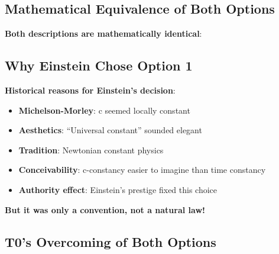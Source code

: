 	\subsection{Mathematical Equivalence of Both Options}
	
	\textbf{Both descriptions are mathematically identical}:
	
	\begin{table}[htbp]
		\centering
		\caption{Two views, identical physics}
	\end{table}
	
	\subsection{Why Einstein Chose Option 1}
	
	\textbf{Historical reasons for Einstein's decision}:
	\begin{itemize}
		\item \textbf{Michelson-Morley}: c seemed locally constant
		\item \textbf{Aesthetics}: ``Universal constant'' sounded elegant
		\item \textbf{Tradition}: Newtonian constant physics
		\item \textbf{Conceivability}: c-constancy easier to imagine than time constancy
		\item \textbf{Authority effect}: Einstein's prestige fixed this choice
	\end{itemize}
	
	\textbf{But it was only a convention, not a natural law!}
	
	\subsection{T0's Overcoming of Both Options}
	
